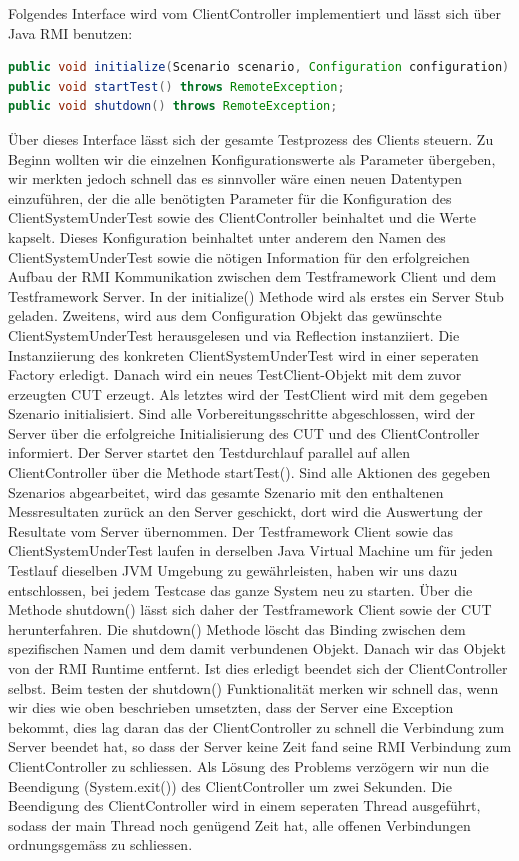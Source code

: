 Folgendes Interface wird vom ClientController implementiert und lässt sich über Java RMI benutzen:
\begin{lstlisting}[language=java, breaklines=true] 	
public void initialize(Scenario scenario, Configuration configuration) throws RemoteException;
public void startTest() throws RemoteException;
public void shutdown() throws RemoteException;
\end{lstlisting}
Über dieses Interface lässt sich der gesamte Testprozess des Clients steuern. Zu Beginn wollten wir die einzelnen Konfigurationswerte als Parameter übergeben, wir merkten jedoch schnell das es sinnvoller wäre einen neuen Datentypen einzuführen, der die alle benötigten Parameter für die Konfiguration des ClientSystemUnderTest sowie des ClientController beinhaltet und die Werte kapselt. Dieses Konfiguration beinhaltet unter anderem den Namen des ClientSystemUnderTest sowie die nötigen Information für den erfolgreichen Aufbau der RMI Kommunikation zwischen dem Testframework Client und dem Testframework Server. In der initialize() Methode wird als erstes ein Server Stub geladen. Zweitens, wird aus dem Configuration Objekt das gewünschte ClientSystemUnderTest herausgelesen und via Reflection instanziiert. Die Instanziierung des konkreten ClientSystemUnderTest wird in einer seperaten Factory erledigt. Danach wird ein neues TestClient-Objekt mit dem zuvor erzeugten CUT erzeugt. Als letztes wird der TestClient wird mit dem gegeben Szenario initialisiert. Sind alle Vorbereitungsschritte abgeschlossen, wird der Server über die erfolgreiche Initialisierung des CUT und des ClientController informiert. Der Server startet den Testdurchlauf parallel auf allen ClientController über die Methode startTest(). Sind alle Aktionen des gegeben Szenarios abgearbeitet, wird das gesamte Szenario mit den enthaltenen Messresultaten zurück an den Server geschickt, dort wird die Auswertung der Resultate vom Server übernommen. Der Testframework Client sowie das ClientSystemUnderTest laufen in derselben Java Virtual Machine um für jeden Testlauf dieselben JVM Umgebung zu gewährleisten, haben wir uns dazu entschlossen, bei jedem Testcase das ganze System neu zu starten. Über die Methode shutdown() lässt sich daher der Testframework Client sowie der CUT herunterfahren. Die shutdown() Methode löscht das Binding zwischen dem spezifischen Namen und dem damit verbundenen Objekt. Danach wir das Objekt von der RMI Runtime entfernt. Ist dies erledigt beendet sich der ClientController selbst. Beim testen der shutdown() Funktionalität merken wir schnell das, wenn wir dies wie oben beschrieben umsetzten, dass der Server eine Exception bekommt, dies lag daran das der ClientController zu schnell die Verbindung zum Server beendet hat, so dass der Server keine Zeit fand seine RMI Verbindung zum ClientController zu schliessen. Als Lösung des Problems verzögern wir nun die Beendigung (System.exit()) des ClientController um zwei Sekunden. Die Beendigung des ClientController wird in einem seperaten Thread ausgeführt, sodass der main Thread noch genügend Zeit hat, alle offenen Verbindungen ordnungsgemäss zu schliessen.    

